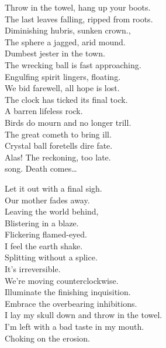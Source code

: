 Throw in the towel, hang up your boots. \\
The last leaves falling, ripped from roots. \\
Diminishing hubris, sunken crown., \\
The sphere a jagged, arid mound. \\
Dumbest jester in the town. \\

The wrecking ball is fast approaching. \\
Engulfing spirit lingers, floating. \\
We bid farewell, all hope is lost. \\
The clock has ticked its final tock. \\
A barren lifeless rock. \\

Birds do mourn and no longer trill. \\
The great  cometh to bring ill. \\
Crystal ball foretells dire fate. \\
Alas! The reckoning, too late. \\

 song. Death comes… \\


Let it out with a final sigh. \\
Our mother fades away. \\
Leaving the world behind, \\
Blistering in a blaze. \\
Flickering flamed-eyed. \\
I feel the earth shake. \\
Splitting without a splice. \\
It's irreversible. \\
We're moving counterclockwise. \\

Illuminate the finishing inquisition. \\
Embrace the overbearing inhibitions. \\
I lay my skull down and throw in the towel. \\
I'm left with a bad taste in my mouth. \\
Choking on the  erosion. \\


